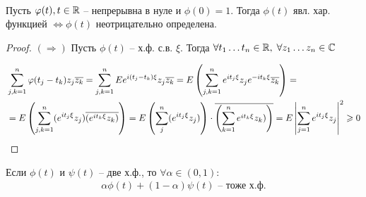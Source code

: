 \begin{theorem}~

  Пусть $\varphi(t), t \in \mathbb{R}$ -- непрерывна в нуле и $\phi(0) = 1$. 
  Тогда $\phi(t)$ явл. хар. функцией $\Leftrightarrow \phi(t)$ неотрицательно определена.

  \begin{proof}
    $(\Rightarrow)$ Пусть $\phi(t)$ -- х.ф. с.в. $\xi$.
    Тогда $\forall t_1 \ldots t_n \in \mathbb{R}, \; \forall z_1 \ldots z_n \in \mathbb{C}$

    \begin{align*}
      &\sum_{j, k = 1}^{n} \varphi(t_j - t_k) z_j \overline{z_k} 
      = \sum_{j, k = 1}^{n} E e^{i (t_j - t_k) \xi} z_j \overline{z_k} 
      = E \left( \sum_{j, k = 1}^{n} e^{i t_j \xi} z_j e^{-i t_k \xi} \overline{z_k} \right) = \\
      &= E \left( \sum_{j, k = 1}^{n} (e^{i t_j \xi} z_j) \overline{(e^{i t_k \xi} z_k)} \right)
      = E \left( \sum_{j}^{n} (e^{i t_j \xi} z_j) \right) 
      \cdot \overline{\left( \sum_{k = 1}^{n} e^{i t_k \xi} z_k) \right)}
      = E \left | \sum_{j = 1}^{n} e^{i t_j \xi} z_j  \right |^2 \geqslant 0
    \end{align*}
  \end{proof}
\end{theorem}

\begin{corollary}
  Если $\phi(t)$  и $\psi(t)$ -- две х.ф., 
  то $\forall \alpha \in (0, 1):$ 
  \begin{align*}
    \alpha \phi(t) + (1 - \alpha) \psi(t) \text{ -- тоже х.ф.}
  \end{align*}
\end{corollary}

